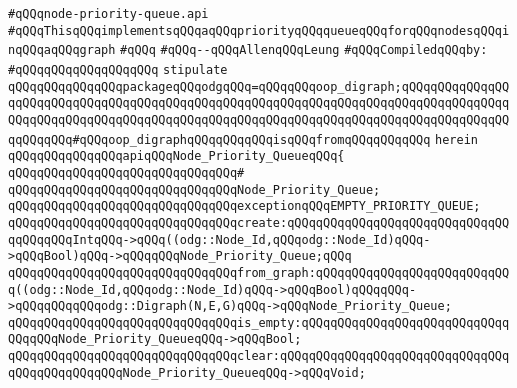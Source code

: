 \label{src/lib/graph/node-priority-queue.api}
\verb|#qQQqnode-priority-queue.api|\newline
\verb|#qQQqThisqQQqimplementsqQQqaqQQqpriorityqQQqqueueqQQqforqQQqnodesqQQqinqQQqaqQQqgraph|\newline
\verb|#qQQq|\newline
\verb|#qQQq--qQQqAllenqQQqLeung|\newline
\newline
\verb|#qQQqCompiledqQQqby:|\newline
\verb|#qQQqqQQqqQQqqQQqqQQq|\newline
\newline
\verb|stipulate|\newline
\verb|qQQqqQQqqQQqqQQqpackageqQQqodgqQQq=qQQqqQQqoop_digraph;qQQqqQQqqQQqqQQqqQQqqQQqqQQqqQQqqQQqqQQqqQQqqQQqqQQqqQQqqQQqqQQqqQQqqQQqqQQqqQQqqQQqqQQqqQQqqQQqqQQqqQQqqQQqqQQqqQQqqQQqqQQqqQQqqQQqqQQqqQQqqQQqqQQqqQQqqQQqqQQqqQQq#qQQqoop_digraphqQQqqQQqqQQqisqQQqfromqQQqqQQqqQQq|\newline
\verb|herein|\newline
\newline
\verb|qQQqqQQqqQQqqQQqapiqQQqNode_Priority_QueueqQQq{|\newline
\verb|qQQqqQQqqQQqqQQqqQQqqQQqqQQqqQQq#|\newline
\verb|qQQqqQQqqQQqqQQqqQQqqQQqqQQqqQQqNode_Priority_Queue;|\newline
\newline
\verb|qQQqqQQqqQQqqQQqqQQqqQQqqQQqqQQqexceptionqQQqEMPTY_PRIORITY_QUEUE;|\newline
\newline
\verb|qQQqqQQqqQQqqQQqqQQqqQQqqQQqqQQqcreate:qQQqqQQqqQQqqQQqqQQqqQQqqQQqqQQqqQQqqQQqIntqQQq->qQQq((odg::Node_Id,qQQqodg::Node_Id)qQQq->qQQqBool)qQQq->qQQqqQQqNode_Priority_Queue;qQQq|\newline
\newline
\verb|qQQqqQQqqQQqqQQqqQQqqQQqqQQqqQQqfrom_graph:qQQqqQQqqQQqqQQqqQQqqQQqqQQq((odg::Node_Id,qQQqodg::Node_Id)qQQq->qQQqBool)qQQqqQQq->qQQqqQQqqQQqodg::Digraph(N,E,G)qQQq->qQQqNode_Priority_Queue;|\newline
\newline
\verb|qQQqqQQqqQQqqQQqqQQqqQQqqQQqqQQqis_empty:qQQqqQQqqQQqqQQqqQQqqQQqqQQqqQQqqQQqNode_Priority_QueueqQQq->qQQqBool;|\newline
\verb|qQQqqQQqqQQqqQQqqQQqqQQqqQQqqQQqclear:qQQqqQQqqQQqqQQqqQQqqQQqqQQqqQQqqQQqqQQqqQQqqQQqNode_Priority_QueueqQQq->qQQqVoid;|\newline
